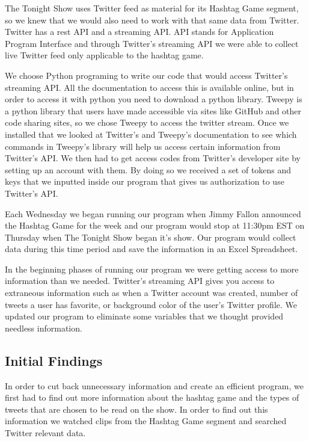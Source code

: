 \documentclass[titlepage]{article}
\begin{document}
The Tonight Show uses Twitter feed as material for its Hashtag Game segment, so we knew that we would also need to work with that same data from Twitter. Twitter has a rest API and a streaming API. API stands for Application Program Interface and through Twitter's streaming API we were able to collect live Twitter feed only applicable to the hashtag game. 

We choose Python programing to write our code that would access Twitter's streaming API. All the documentation to access this is available online, but in order to access it with python you need to download a python library. Tweepy is a python library that users have made accessible via sites like GitHub and other code sharing sites, so we chose Tweepy to access the twitter stream. Once we installed that we looked at Twitter's and Tweepy's documentation to see which commands in Tweepy's library will help us access certain information from Twitter's API. We then had to get access codes from Twitter's developer site by setting up an account with them. By doing so we received a set of tokens and keys that we inputted inside our program that gives us authorization to use Twitter's API. 

Each Wednesday we began running our program when Jimmy Fallon announced the Hashtag Game for the week and our program would stop at 11:30pm EST on Thursday when The Tonight Show began it's show. Our program would collect data during this time period and save the information in an Excel Spreadsheet. 

In the beginning phases of running our program we were getting access to more information than we needed. Twitter's streaming API gives you access to extraneous information such as when a Twitter account was created, number of tweets a user has favorite, or background color of the user's Twitter profile. We updated our program to eliminate some variables that we thought provided needless information. 

\subsection{Initial Findings}

In order to cut back unnecessary information and create an efficient program, we first had to find out more information about the hashtag game and the types of tweets that are chosen to be read on the show. In order to find out this information we watched clips from the Hashtag Game segment and searched Twitter relevant data.  
\end{document}
